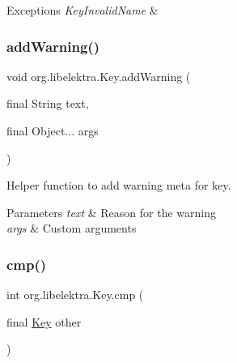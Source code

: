 \begin{DoxyExceptions}{Exceptions}
{\em Key\+Invalid\+Name} & \\
\hline
\end{DoxyExceptions}
\mbox{\label{classorg_1_1libelektra_1_1Key_a542a69d75c304dda3f78cb3b185022ee}} 
\subsubsection{\texorpdfstring{add\+Warning()}{addWarning()}}
{\footnotesize\ttfamily void org.\+libelektra.\+Key.\+add\+Warning (\begin{DoxyParamCaption}\item[{final String}]{text,  }\item[{final Object...}]{args }\end{DoxyParamCaption})\hspace{0.3cm}{\ttfamily [inline]}}



Helper function to add warning meta for key. 


\begin{DoxyParams}{Parameters}
{\em text} & Reason for the warning \\
\hline
{\em args} & Custom arguments \\
\hline
\end{DoxyParams}
\mbox{\label{classorg_1_1libelektra_1_1Key_aa5271913871c1ee2f31f32190a7e14aa}} 
\subsubsection{\texorpdfstring{cmp()}{cmp()}}
{\footnotesize\ttfamily int org.\+libelektra.\+Key.\+cmp (\begin{DoxyParamCaption}\item[{final \hyperlink{classorg_1_1libelektra_1_1Key}{Key}}]{other }\end{DoxyParamCaption})\hspace{0.3cm}{\ttfamily [inline]}}



